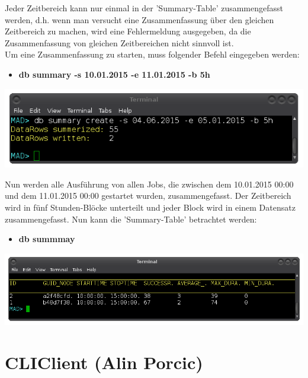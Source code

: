 \documentclass[12pt,a4paper]{report}
\begin{document}
\begin{onehalfspace}
Jeder Zeitbereich kann nur einmal in der 'Summary-Table' zusammengefasst werden, d.h. wenn man versucht eine Zusammenfassung über den gleichen Zeitbereich zu machen, wird eine Fehlermeldung ausgegeben, da die Zusammenfassung von gleichen Zeitbereichen nicht sinnvoll ist.\\

Um eine Zusammenfassung zu starten, muss folgender Befehl eingegeben werden:

\begin{itemize}
\item \textbf{db summary -s 10.01.2015 -e 11.01.2015 -b 5h}
\end{itemize}

\begin{center}
\includegraphics[scale=0.5]{img/db_summary_create.png}
\end{center}

Nun werden alle Ausführung von allen Jobs, die zwischen dem 10.01.2015 00:00 und dem 11.01.2015 00:00 gestartet wurden, zusammengefasst. Der Zeitbereich wird in fünf Stunden-Blöcke unterteilt und jeder Block wird in einem Datensatz zusammengefasst. Nun kann die 'Summary-Table' betrachtet werden:\\

\begin{itemize}
\item \textbf{db summmay}
\end{itemize}

\begin{center}
\includegraphics[scale=0.5]{img/db_summary.png}
\end{center}

\chapter{CLIClient (Alin Porcic)}


\end{onehalfspace}
\end{document}
